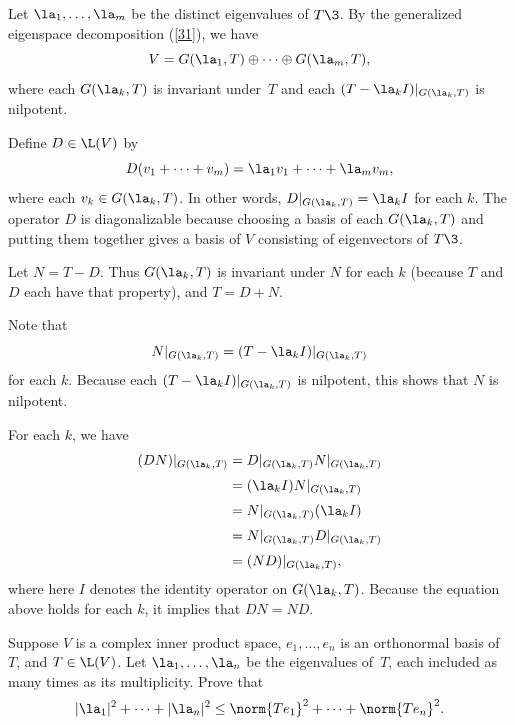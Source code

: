 \begin{Solution}
Let $\la_1, \dots, \la_m$ be the distinct eigenvalues of $T\3$. By the generalized eigenspace decomposition (\ref{31}), we have
\[
V = G(\la_1, T) \oplus \dots \oplus G(\la_m, T),
\]
where each $G(\la_k, T)$ is invariant under~$T$ and each $(T - \la_k I)|_{G(\la_k, T)}$ is nilpotent.

Define $D \in \L(V)$ by
\[
D(v_1 + \dots + v_m) = \la_1 v_1 + \dots + \la_m v_m,
\]
where each $v_k \in G(\la_k, T)$. In other words, $D|_{G(\la_k, T)} = \la_k I$ for each $k$. The operator $D$ is diagonalizable because choosing a basis of each $G(\la_k, T)$ and putting them together gives a basis of $V$ consisting of eigenvectors of $T\3$.

Let $N = T - D$. Thus $G(\la_k, T)$ is invariant under $N$ for each $k$ (because $T$ and $D$ each have that property), and $T = D + N$.

Note that
\[
N|_{G(\la_k, T)} = (T - \la_k I)|_{G(\la_k, T)}
\]
for each $k$. Because each $(T - \la_k I)|_{G(\la_k, T)}$ is nilpotent, this shows that $N$ is nilpotent.

For each $k$, we have
\begin{align*}
(DN)|_{G(\la_k, T)} &= D|_{G(\la_k, T)} N|_{G(\la_k, T)} \\[3bp]
&= (\la_k I) N|_{G(\la_k, T)} \\[3bp]
&= N|_{G(\la_k, T)} (\la_k I)\\[3bp]
&= N|_{G(\la_k, T)} D|_{G(\la_k, T)} \\[3bp]
&= (ND)|_{G(\la_k, T)},
\end{align*}
where here $I$ denotes the identity operator on $G(\la_k, T)$. Because the equation above holds for each $k$, it implies that $DN = ND$.
\end{Solution}

\exercise
Suppose $V$ is a complex inner product space, $e_1, \ldots, e_n$ is an orthonormal basis of $T$, and $T \in \L(V)$.  Let
$\la_1, \dots, \la_n$ be the eigenvalues of~$T$, each included as many times as its multiplicity. Prove that
\[
|\la_1|^2 + \dots + |\la_n|^2 \le \norm{Te_1}^2 + \cdots + \norm{Te_n}^2.
\]

